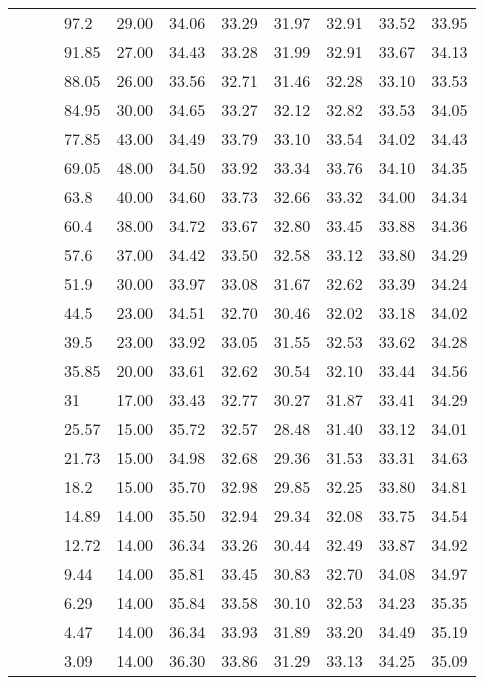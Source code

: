 \begin{longtable}{llllrrrrrrr}
   &  &  & 97.2 & 29.00 & 34.06 & 33.29 & 31.97 & 32.91 & 33.52 & 33.95 \\ 
   &  &  & 91.85 & 27.00 & 34.43 & 33.28 & 31.99 & 32.91 & 33.67 & 34.13 \\ 
   &  &  & 88.05 & 26.00 & 33.56 & 32.71 & 31.46 & 32.28 & 33.10 & 33.53 \\ 
   &  &  & 84.95 & 30.00 & 34.65 & 33.27 & 32.12 & 32.82 & 33.53 & 34.05 \\ 
   &  &  & 77.85 & 43.00 & 34.49 & 33.79 & 33.10 & 33.54 & 34.02 & 34.43 \\ 
   &  &  & 69.05 & 48.00 & 34.50 & 33.92 & 33.34 & 33.76 & 34.10 & 34.35 \\ 
   &  &  & 63.8 & 40.00 & 34.60 & 33.73 & 32.66 & 33.32 & 34.00 & 34.34 \\ 
   &  &  & 60.4 & 38.00 & 34.72 & 33.67 & 32.80 & 33.45 & 33.88 & 34.36 \\ 
   &  &  & 57.6 & 37.00 & 34.42 & 33.50 & 32.58 & 33.12 & 33.80 & 34.29 \\ 
   &  &  & 51.9 & 30.00 & 33.97 & 33.08 & 31.67 & 32.62 & 33.39 & 34.24 \\ 
   &  &  & 44.5 & 23.00 & 34.51 & 32.70 & 30.46 & 32.02 & 33.18 & 34.02 \\ 
   &  &  & 39.5 & 23.00 & 33.92 & 33.05 & 31.55 & 32.53 & 33.62 & 34.28 \\ 
   &  &  & 35.85 & 20.00 & 33.61 & 32.62 & 30.54 & 32.10 & 33.44 & 34.56 \\ 
   &  &  & 31 & 17.00 & 33.43 & 32.77 & 30.27 & 31.87 & 33.41 & 34.29 \\ 
   &  &  & 25.57 & 15.00 & 35.72 & 32.57 & 28.48 & 31.40 & 33.12 & 34.01 \\ 
   &  &  & 21.73 & 15.00 & 34.98 & 32.68 & 29.36 & 31.53 & 33.31 & 34.63 \\ 
   &  &  & 18.2 & 15.00 & 35.70 & 32.98 & 29.85 & 32.25 & 33.80 & 34.81 \\ 
   &  &  & 14.89 & 14.00 & 35.50 & 32.94 & 29.34 & 32.08 & 33.75 & 34.54 \\ 
   &  &  & 12.72 & 14.00 & 36.34 & 33.26 & 30.44 & 32.49 & 33.87 & 34.92 \\ 
   &  &  & 9.44 & 14.00 & 35.81 & 33.45 & 30.83 & 32.70 & 34.08 & 34.97 \\ 
   &  &  & 6.29 & 14.00 & 35.84 & 33.58 & 30.10 & 32.53 & 34.23 & 35.35 \\ 
   &  &  & 4.47 & 14.00 & 36.34 & 33.93 & 31.89 & 33.20 & 34.49 & 35.19 \\ 
   &  &  & 3.09 & 14.00 & 36.30 & 33.86 & 31.29 & 33.13 & 34.25 & 35.09 \\ 

\end{longtable}
